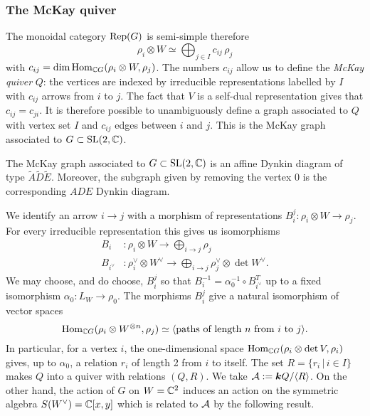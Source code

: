 \documentclass{amsart}
\theoremstyle{definition}
\begin{document}
\subsubsection{The McKay quiver}
The monoidal category $\operatorname{Rep}(G)$ is semi-simple therefore $$\rho_i \otimes W \simeq \bigoplus_{j \in I} c_{ij} \, \rho_j$$
with $c_{ij} =\dim \operatorname{Hom}_{\mathbb{C} G}(\rho_i \otimes W, \rho_j)$.
The numbers $c_{ij}$ allow us to define the {\em McKay quiver} $Q$: the vertices are indexed by irreducible representations labelled by $I$ with $c_{ij}$  arrows from $i$ to $j$.
The fact that $V$ is a self-dual representation gives that $c_{ij} = c_{ji}$.
It is therefore possible to unambiguously define a graph associated to $Q$ with vertex set $I$ and $c_{ij}$ edges between $i$ and $j$.
This is the McKay graph associated to $G \subset \operatorname{SL}(2,\mathbb{C})$.

\begin{theorem}
The McKay graph associated to $G \subset \operatorname{SL}(2,\mathbb{C})$ is an affine Dynkin diagram of type $\widetilde{A}\widetilde{D}\widetilde{E}$.
Moreover, the subgraph given by removing the vertex $0$ is the corresponding $ADE$ Dynkin diagram.
\end{theorem}

We identify an arrow $i \rightarrow j$ with a morphism of representations $B_i^j \colon \rho_i \otimes W \rightarrow \rho_j$.
For every irreducible representation this gives us isomorphisms 
\begin{align}
    B_i &\colon \rho_i \otimes W \longrightarrow \bigoplus_{i \rightarrow j} \rho_j \\
    B_{i^\vee} &\colon \rho_i^\vee \otimes W^\vee \longrightarrow \bigoplus_{i \rightarrow j} \rho_j^\vee \otimes \det W^\vee.
\end{align}
We may choose, and do choose, $B_i^j$ so that $B_i^{-1} = \alpha_0^{-1} \circ B_{i^\vee}^T$ up to a fixed isomorphism $\alpha_0 \colon L_W \rightarrow \rho_0$.
The morphisms $B_i^j$ give a natural isomorphism of vector spaces $$\operatorname{Hom}_{\mathbb{C} G}(\rho_i \otimes W^{\otimes n}, \rho_j) \simeq \langle \text{paths of length }n \text{ from }i \text{ to } j\rangle.$$
In particular, for a vertex $i$, the one-dimensional space $\operatorname{Hom}_{\mathbb{C} G} (\rho_i \otimes \operatorname{det}{V}, \rho_i)$ gives, up to $\alpha_0$, a relation $r_i$ of length 2 from $i$ to itself.
The set $R = \{r_i \, |\, i \in I\}$ makes $Q$ into a quiver with relations $(Q, R)$. 
We take $\mathcal{A}:= {\boldsymbol{k}} Q/ \langle R\rangle$.
On the other hand, the action of $G$ on $W=\mathbb{C}^2$ induces an action on the symmetric algebra $S(W^\vee)=\mathbb{C}[x,y]$ which is related to $\mathcal{A}$ by the following result.
\end{document}
